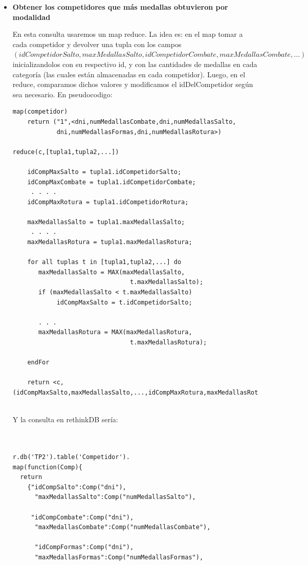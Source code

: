 \begin{itemize}
\item{\textbf{Obtener los competidores que m\'as medallas obtuvieron por modalidad}

En esta consulta usaremos un map reduce. La idea es: en el map tomar a cada competidor y devolver una tupla con los campos $(idCompetidorSalto,maxMedallasSalto,idCompetidorCombate,maxMedallasCombate,...)$ inicializandolos con su respectivo id, y con las cantidades de medallas en cada categoría (las cuales están almacenadas en cada competidor). Luego, en el reduce, comparamos dichos valores y modificamos el idDelCompetidor según sea necesario. En pseudocodigo:

\begin{verbatim}
map(competidor)
	return ("1",<dni,numMedallasCombate,dni,numMedallasSalto,
			dni,numMedallasFormas,dni,numMedallasRotura>)
			
reduce(c,[tupla1,tupla2,...])
	
	idCompMaxSalto = tupla1.idCompetidorSalto;
	idCompMaxCombate = tupla1.idCompetidorCombate;
	 . . . . 
	idCompMaxRotura = tupla1.idCompetidorRotura;
	
	maxMedallasSalto = tupla1.maxMedallasSalto;
	 . . . .
	maxMedallasRotura = tupla1.maxMedallasRotura;
	
	for all tuplas t in [tupla1,tupla2,...] do
	   maxMedallasSalto = MAX(maxMedallasSalto,
								t.maxMedallasSalto);          
	   if (maxMedallasSalto < t.maxMedallasSalto)
			idCompMaxSalto = t.idCompetidorSalto;
	   
	   . . .
	   maxMedallasRotura = MAX(maxMedallasRotura,
								t.maxMedallasRotura);          
	   
	endFor						
	
	return <c,(idCompMaxSalto,maxMedallasSalto,...,idCompMaxRotura,maxMedallasRotura)>


\end{verbatim}

Y la consulta en rethinkDB ser\'ia:\\ \\

\begin{verbatim}

r.db('TP2').table('Competidor').
map(function(Comp){
  return 
    {"idCompSalto":Comp("dni"),
      "maxMedallasSalto":Comp("numMedallasSalto"),
      
     "idCompCombate":Comp("dni"),
      "maxMedallasCombate":Comp("numMedallasCombate"),
     
      "idCompFormas":Comp("dni"),
      "maxMedallasFormas":Comp("numMedallasFormas"),
      

\end{verbatim}}
\end{itemize}
